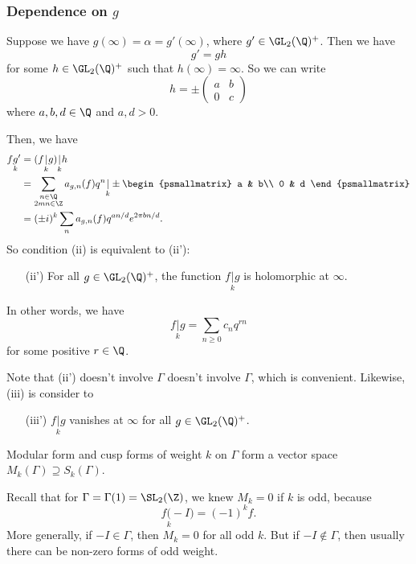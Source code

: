 \documentclass[a4paper]{article}
\begin{document}
\subsubsection*{Dependence on $g$}
Suppose we have $g(\infty) = \alpha = g'(\infty)$, where $g' \in \GL_2(\Q)^+$. Then we have
\[
  g' = gh
\]
for some $h \in \GL_2(\Q)^+$ such that $h(\infty) = \infty$. So we can write
\[
  h = \pm
  \begin{pmatrix}
    a & b\\
    0 & c
  \end{pmatrix}
\]
where $a, b, d \in \Q$ and $a, d > 0$.

Then, we have
\begin{align*}
  f\underset{k} g' &= (f \underset{k}{|} g) \underset{k}{|} h \\
  &= \sum_{\substack{n \in \Q \\ 2mn \in \Z}} a_{g, n} (f) q^n \underset{k}{|} \pm
  \begin{psmallmatrix}
    a & b\\
    0 & d
  \end{psmallmatrix}\\
  &= (\pm i)^k \sum_n a_{g, n} (f) q^{an/d} e^{2\pi bn/d}.
\end{align*}
So condition (ii) is equivalent to (ii'):
\begin{enumerate}
  \item[(ii')] For all $g \in \GL_2(\Q)^+$, the function $f\underset{k}{|} g$ is holomorphic at $\infty$.
\end{enumerate}
In other words, we have
\[
  f\underset{k}{|} g = \sum_{n \geq 0} c_n q^{rn}
\]
for some positive $r \in \Q$.

Note that (ii') doesn't involve $\Gamma$ doesn't involve $\Gamma$, which is convenient. Likewise, (iii) is consider to
\begin{enumerate}
  \item[(iii')] $f\underset{k}{|} g$ vanishes at $\infty$ for all $g \in \GL_2(\Q)^+$.
\end{enumerate}

Modular form and cusp forms of weight $k$ on $\Gamma$ form a vector space $M_k(\Gamma) \supseteq S_k(\Gamma)$.

Recall that for $\Gamma = \Gamma(1) = \SL_2(\Z)$, we knew $M_k = 0$ if $k$ is odd, because
\[
  f\underset{k} (-I) = (-1)^k f.
\]
More generally, if $-I \in \Gamma$, then $M_k = 0$ for all odd $k$. But if $-I \not\in \Gamma$, then usually there can be non-zero forms of odd weight.
\end{document}
